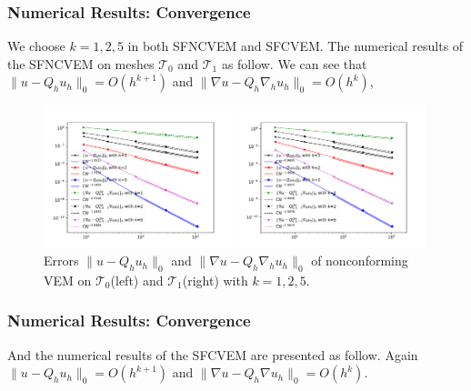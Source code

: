 \documentclass[notheorems,serif]{beamer}
\begin{document}
\begin{CJK}{UTF8}{gkai}
\begin{frame}
    \frametitle{Numerical Results: Convergence}
We choose $k = 1, 2, 5$ in both SFNCVEM and SFCVEM.
The numerical results of the SFNCVEM on meshes $\mathcal T_0$ and $\mathcal T_1$
as follow. We can see that $\|u - Q_h u_h\|_0=O(h^{k+1})$ and $\|\nabla u -
Q_{h}\nabla_h u_h\|_0=O(h^{k})$, 
\begin{figure}[htbp]
\centering
\begin{minipage}[t]{0.49\linewidth}
\centering
\includegraphics[width=5.5cm]{../figures/stabfree/ncvem_convex.pdf}
\end{minipage}%
\begin{minipage}[t]{0.49\linewidth}
\centering
\includegraphics[width=5.5cm]{../figures/stabfree/ncvem_nonconvex.pdf}
\end{minipage}%
\centering
\caption{Errors $\|u - Q_h u_h\|_0$ and $\|\nabla u - Q_{h}\nabla_h u_h\|_0$
of nonconforming VEM on
$\mathcal T_0$(left) and $\mathcal T_1$(right) with $k=1, 2, 5$.}
\label{fig:rate1}
\end{figure}


\end{frame}

\begin{frame}
    \frametitle{Numerical Results: Convergence}
And the numerical results of the SFCVEM are presented as follow. 
Again $\|u - Q_h u_h\|_0=O(h^{k+1})$ and $\|\nabla u - Q_{h}\nabla
u_h\|_0=O(h^{k})$. 


\end{frame}
\end{CJK}
\end{document}
